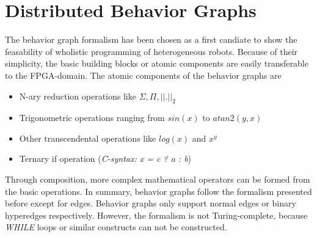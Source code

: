 \documentclass[a4paper,twocolumn]{esapub2005} %
\begin{document}

\section{Distributed Behavior Graphs}
The behavior graph formalism has been chosen as a first candiate to show the feasability of wholistic programming of heterogeneous robots.
Because of their simplicity, the basic building blocks or atomic components are easily transferable to the FPGA-domain.
The atomic components of the behavior graphs are
\begin{itemize}
    \item N-ary reduction operations like $\Sigma,\Pi,{||.||}_{2}$
    \item Trigonometric operations ranging from $sin(x)$ to $atan2(y,x)$
    \item Other transcendental operations like $log(x)$ and $x^y$
    \item Ternary if operation (\emph{C-syntax: x = c ? a : b})
\end{itemize}
Through composition, more complex mathematical operators can be formed from the basic operations.
In summary, behavior graphs follow the formalism presented before except for edges.
Behavior graphs only support normal edges or binary hyperedges respectively.
However, the formalism is not Turing-complete, because \emph{WHILE} loops or similar constructs can not be constructed.
\end{document}
